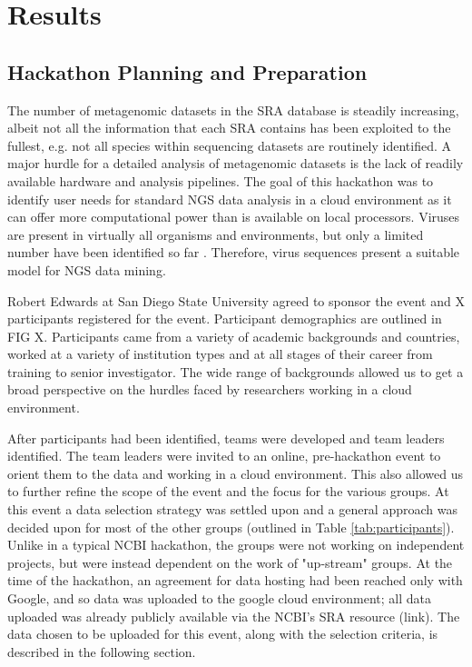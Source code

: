 \section{Results}
  \subsection{Hackathon Planning and Preparation}
  The number of metagenomic datasets in the SRA database is steadily
  increasing, albeit not all the information that each SRA contains has been
  exploited to the fullest, e.g. not all species within sequencing datasets are
  routinely identified. A major hurdle for a detailed analysis of metagenomic
  datasets is the lack of readily available hardware and analysis pipelines.
  The goal of this hackathon was to identify user needs for  standard NGS data
  analysis in a cloud environment as it can offer more computational power than
  is available on local processors. Viruses are present in virtually all
  organisms and environments, but only a limited number have been identified so
  far \cite{Shi2016}. Therefore, virus sequences present a suitable model for
  NGS data mining.

  Robert Edwards at San Diego State University agreed to sponsor the event and
  X participants registered for the event. Participant demographics are
  outlined in FIG X. Participants came from a variety of academic backgrounds
  and countries, worked at a variety of institution types and at all stages of
  their career from training to senior investigator. The wide range of
  backgrounds allowed us to get a broad perspective on the hurdles faced by
  researchers working in a cloud environment.

  After participants had been identified, teams were developed and team leaders
  identified. The team leaders were invited to an online, pre-hackathon event
  to orient them to the data and working in a cloud environment. This also
  allowed us to further refine the scope of the event and the focus for the
  various groups. At this event a data selection strategy was settled upon and
  a general approach was decided upon for most of the other groups (outlined in
  Table \ref{tab:participants}). Unlike in a typical NCBI hackathon, the groups were
  not working on independent projects, but were instead dependent on the work
  of "up-stream" groups. At the time of the hackathon, an agreement for data
  hosting had been reached only with Google, and so data was uploaded to the
  google cloud environment; all data uploaded was already publicly available
  via the NCBI's SRA resource (link). The data chosen to be uploaded for this
  event, along with the selection criteria, is described in the following
  section.

